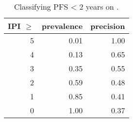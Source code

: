 \begin{table}[ht]
\centering
\begin{tabular}{rrr}
  \hline
IPI $\geq$ & prevalence & precision \\ 
  \hline
  5 & 0.01 & 1.00 \\ 
    4 & 0.13 & 0.65 \\ 
    3 & 0.35 & 0.55 \\ 
    2 & 0.59 & 0.48 \\ 
    1 & 0.85 & 0.41 \\ 
    0 & 1.00 & 0.37 \\ 
   \hline
\end{tabular}
\caption{Classifying PFS < 2 years on \autocite{schmitz18}.} 
\label{fig:ipi-schmitz}
\end{table}
